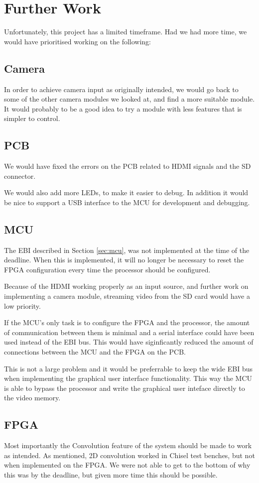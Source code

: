 \section{Further Work}

Unfortunately, this project has a limited timeframe.
Had we had more time, we would have prioritised working on the following:

\subsection{Camera}
In order to achieve camera input as originally intended, we would go back to some of the other camera modules we looked at, and find a more suitable module.
It would probably to be a good idea to try a module with less features that is simpler to control.

\subsection{PCB}
We would have fixed the errors on the PCB related to HDMI signals and the SD connector.

We would also add more LEDs, to make it easier to debug.
In addition it would be nice to support a USB interface to the MCU for development and debugging.

\subsection{MCU}
The EBI described in Section \ref{sec:mcu}, was not implemented at the time of the deadline.
When this is implemented, it will no longer be necessary to reset the FPGA configuration every time the processor should be configured.

Because of the HDMI working properly as an input source, and further work on implementing a camera module, streaming video from the SD card would have a low priority.

If the MCU's only task is to configure the FPGA and the processor, the amount of communication between them is minimal and a serial interface could have been used instead of the EBI bus.
This would have siginficantly reduced the amount of connections between the MCU and the FPGA on the PCB.

This is not a large problem and it would be preferrable to keep the wide EBI bus when implementing the graphical user interface functionality.
This way the MCU is able to bypass the processor and write the graphical user inteface directly to the video memory.

\subsection{FPGA}
Most importantly the Convolution feature of the system should be made to work as intended.
As mentioned, 2D convolution worked in Chisel test benches, but not when implemented on the FPGA.
We were not able to get to the bottom of why this was by the deadline, but given more time this should be possible.

